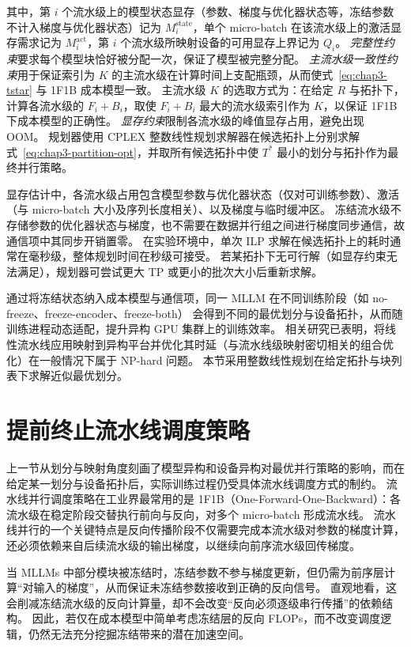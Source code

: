其中，第 $i$ 个流水级上的模型状态显存（参数、梯度与优化器状态等，冻结参数不计入梯度与优化器状态）记为 $M_i^{\mathrm{state}}$，单个 micro-batch 在该流水级上的激活显存需求记为 $M_i^{\mathrm{act}}$，第 $i$ 个流水级所映射设备的可用显存上界记为 $Q_i$。
\emph{完整性约束}要求每个模型块恰好被分配一次，保证了模型被完整分配。
\emph{主流水级一致性约束}用于保证索引为 $K$ 的主流水级在计算时间上支配瓶颈，从而使式~\eqref{eq:chap3-tstar} 与 1F1B 成本模型一致。
主流水级 $K$ 的选取方式为：在给定 $R$ 与拓扑下，计算各流水级的 $F_i + B_i$，取使 $F_i + B_i$ 最大的流水级索引作为 $K$，以保证 1F1B 下成本模型的正确性。
\emph{显存约束}限制各流水级的峰值显存占用，避免出现 OOM。
规划器使用 CPLEX 整数线性规划求解器在候选拓扑上分别求解式~\eqref{eq:chap3-partition-opt}，并取所有候选拓扑中使 $T^*$ 最小的划分与拓扑作为最终并行策略。

显存估计中，各流水级占用包含模型参数与优化器状态（仅对可训练参数）、激活（与 micro-batch 大小及序列长度相关）、以及梯度与临时缓冲区。
冻结流水级不存储参数的优化器状态与梯度，也不需要在数据并行组之间进行梯度同步通信，故通信项中其同步开销置零。
在实验环境中，单次 ILP 求解在候选拓扑上的耗时通常在毫秒级，整体规划时间在秒级可接受。
若某拓扑下无可行解（如显存约束无法满足），规划器可尝试更大 TP 或更小的批次大小后重新求解。

通过将冻结状态纳入成本模型与通信项，同一 MLLM 在不同训练阶段（如 no-freeze、freeze-encoder、freeze-both）
会得到不同的最优划分与设备拓扑，从而随训练进程动态适配，提升异构 GPU 集群上的训练效率。
相关研究已表明，将线性流水线应用映射到异构平台并优化其时延（与流水线级映射密切相关的组合优化）在一般情况下属于 NP-hard 问题\cite{benoit2008mapping}。
本节采用整数线性规划在给定拓扑与块列表下求解近似最优划分。

\section{提前终止流水线调度策略}

上一节从划分与映射角度刻画了模型异构和设备异构对最优并行策略的影响，而在给定某一划分与设备拓扑后，实际训练过程仍受具体流水线调度方式的制约。
流水线并行调度策略在工业界最常用的是 1F1B（One-Forward-One-Backward）：各流水级在稳定阶段交替执行前向与反向，对多个 micro-batch 形成流水线。
流水线并行的一个关键特点是反向传播阶段不仅需要完成本流水级对参数的梯度计算，还必须依赖来自后续流水级的输出梯度，以继续向前序流水级回传梯度。

当 MLLMs 中部分模块被冻结时，冻结参数不参与梯度更新，但仍需为前序层计算“对输入的梯度”，从而保证未冻结参数接收到正确的反向信号。
直观地看，这会削减冻结流水级的反向计算量，却不会改变“反向必须逐级串行传播”的依赖结构。
因此，若仅在成本模型中简单考虑冻结层的反向 FLOPs，而不改变调度逻辑，仍然无法充分挖掘冻结带来的潜在加速空间。

